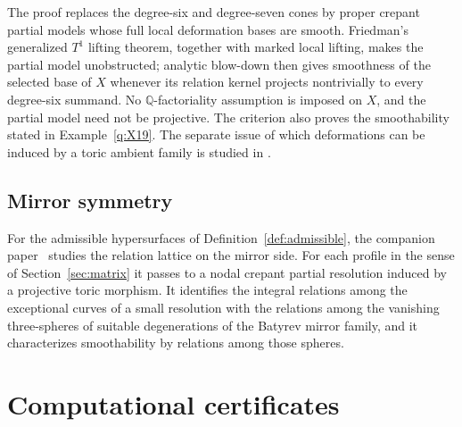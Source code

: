 \documentclass[11pt]{amsart}
\theoremstyle{definition}
\theoremstyle{remark}
\theoremstyle{plain}
\newcommand{\QQ}{\mathbb{Q}}
\begin{document}
The proof replaces the degree-six and degree-seven cones by proper
crepant partial models whose full local deformation bases are smooth.
Friedman's generalized $T^1$ lifting theorem, together with marked
local lifting, makes the partial model unobstructed; analytic
blow-down then gives smoothness of the selected base of $X$ whenever
its relation kernel projects nontrivially to every degree-six
summand.  No $\QQ$-factoriality assumption is imposed on $X$, and the
partial model need not be projective.  The criterion also proves the
smoothability stated in Example~\ref{q:X19}.  The separate issue of which
deformations can be induced by a toric ambient family is studied in
\cite{PaperV}.

\subsection{Mirror symmetry}\label{sec:mirror}
For the admissible hypersurfaces of Definition~\ref{def:admissible}, the
companion paper~\cite{PaperVI} studies the relation lattice on the mirror
side.  For each profile in the sense of Section~\ref{sec:matrix} it passes to a
nodal crepant partial resolution induced by a projective toric morphism.  It
identifies the integral relations among the exceptional curves of a small
resolution with the relations among the vanishing three-spheres of suitable
degenerations of the Batyrev mirror family, and it characterizes
smoothability by relations among those spheres.

\appendix

\section{Computational certificates}\label{app:cert}
\end{document}
